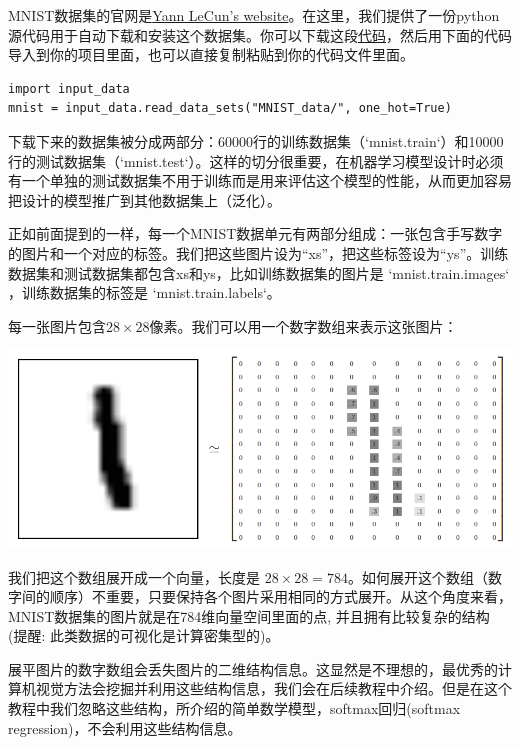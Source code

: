 MNIST数据集的官网是\href{http://yann.lecun.com/exdb/mnist/}{Yann LeCun's website}。在这里，我们提供了一份python源代码用于自动下载和安装这个数据集。你可以下载这段\href{https://tensorflow.googlesource.com/tensorflow/+/master/tensorflow/examples/tutorials/mnist/input_data.py}{代码}，然后用下面的代码导入到你的项目里面，也可以直接复制粘贴到你的代码文件里面。

\begin{lstlisting}
import input_data
mnist = input_data.read_data_sets("MNIST_data/", one_hot=True)
\end{lstlisting}

下载下来的数据集被分成两部分：60000行的训练数据集（`mnist.train`）和10000行的测试数据集（`mnist.test`）。这样的切分很重要，在机器学习模型设计时必须有一个单独的测试数据集不用于训练而是用来评估这个模型的性能，从而更加容易把设计的模型推广到其他数据集上（泛化）。

正如前面提到的一样，每一个MNIST数据单元有两部分组成：一张包含手写数字的图片和一个对应的标签。我们把这些图片设为“xs”，把这些标签设为“ys”。训练数据集和测试数据集都包含xs和ys，比如训练数据集的图片是 `mnist.train.images` ，训练数据集的标签是 `mnist.train.labels`。

每一张图片包含$ 28 \times 28$像素。我们可以用一个数字数组来表示这张图片：

\begin{center}
\includegraphics[width=.85\textwidth]{../SOURCE/images/MNIST-Matrix.png}
\end{center}

我们把这个数组展开成一个向量，长度是 $ 28 \times 28 = 784$。如何展开这个数组（数字间的顺序）不重要，只要保持各个图片采用相同的方式展开。从这个角度来看，MNIST数据集的图片就是在784维向量空间里面的点, 并且拥有比较复杂的结构 (提醒: 此类数据的可视化是计算密集型的)。

展平图片的数字数组会丢失图片的二维结构信息。这显然是不理想的，最优秀的计算机视觉方法会挖掘并利用这些结构信息，我们会在后续教程中介绍。但是在这个教程中我们忽略这些结构，所介绍的简单数学模型，softmax回归(softmax regression)，不会利用这些结构信息。

